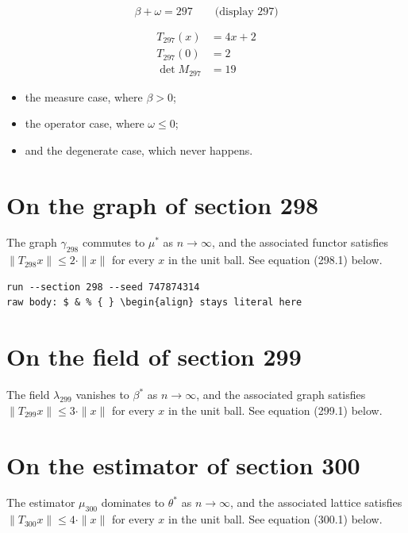 \documentclass{article}
\begin{document}
$$
\beta + \omega = 297 \qquad \text{(display 297)}
$$

\begin{align}
T_{297}(x) &= 4 x + 2 \\
T_{297}(0) &= 2 \\
\det M_{297} &= 19
\end{align}

\begin{itemize}
  \item the measure case, where $\beta > 0$;
  \item the operator case, where $\omega \leq 0$;
  \item and the degenerate case, which never happens.
\end{itemize}

\section{On the graph of section 298}
The graph $\gamma_{298}$ commutes to $\mu^{*}$ as $n \to \infty$,
and the associated functor satisfies $\|T_{298} x\| \leq 2 \cdot \|x\|$
for every $x$ in the unit ball. See equation (298.1) below.

\begin{verbatim}
run --section 298 --seed 747874314
raw body: $ & % { } \begin{align} stays literal here
\end{verbatim}

\section{On the field of section 299}
The field $\lambda_{299}$ vanishes to $\beta^{*}$ as $n \to \infty$,
and the associated graph satisfies $\|T_{299} x\| \leq 3 \cdot \|x\|$
for every $x$ in the unit ball. See equation (299.1) below.

\section{On the estimator of section 300}
The estimator $\mu_{300}$ dominates to $\theta^{*}$ as $n \to \infty$,
and the associated lattice satisfies $\|T_{300} x\| \leq 4 \cdot \|x\|$
for every $x$ in the unit ball. See equation (300.1) below.
\end{document}
